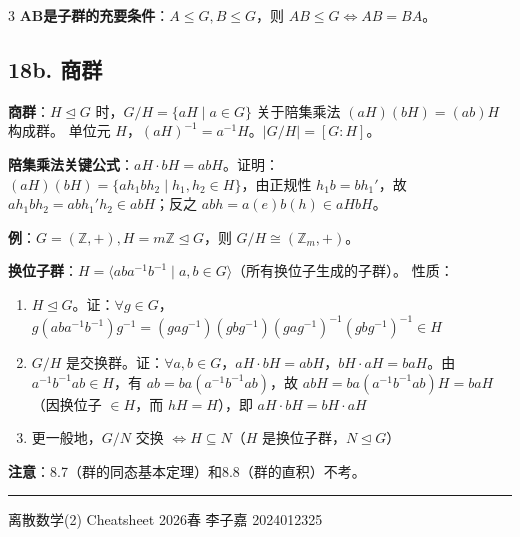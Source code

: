 \documentclass[10pt,a4paper,landscape]{ctexart}
\begin{document}
\begin{multicols}{3}
\textbf{AB是子群的充要条件}：$A\leq G,B\leq G$，则 $AB\leq G\iff AB=BA$。

\subsection*{18b. 商群}

\textbf{商群}：$H\trianglelefteq G$ 时，$G/H=\{aH\mid a\in G\}$ 关于陪集乘法 $(aH)(bH)=(ab)H$ 构成群。
单位元 $H$，$(aH)^{-1}=a^{-1}H$。$|G/H|=[G:H]$。

\textbf{陪集乘法关键公式}：$\boxed{aH\cdot bH=abH}$。证明：$(aH)(bH)=\{ah_1bh_2\mid h_1,h_2\in H\}$，由正规性 $h_1b=bh_1'$，故 $ah_1bh_2=abh_1'h_2\in abH$；反之 $abh=a(e)b(h)\in aHbH$。

\textbf{例}：$G=(\mathbb{Z},+),H=m\mathbb{Z}\trianglelefteq G$，则 $G/H\cong(\mathbb{Z}_m,+)$。

\textbf{换位子群}：$H=\langle aba^{-1}b^{-1}\mid a,b\in G\rangle$（所有换位子生成的子群）。
性质：
\begin{enumerate}[nosep,leftmargin=*]
\item $H\trianglelefteq G$。证：$\forall g\in G$，$g(aba^{-1}b^{-1})g^{-1}=(gag^{-1})(gbg^{-1})(gag^{-1})^{-1}(gbg^{-1})^{-1}\in H$
\item $G/H$ 是交换群。证：$\forall a,b\in G$，$aH\cdot bH=abH$，$bH\cdot aH=baH$。由 $a^{-1}b^{-1}ab\in H$，有 $ab=ba(a^{-1}b^{-1}ab)$，故 $abH=ba(a^{-1}b^{-1}ab)H=baH$（因换位子 $\in H$，而 $hH=H$），即 $aH\cdot bH=bH\cdot aH$
\item 更一般地，$G/N$ 交换 $\iff H\subseteq N$（$H$ 是换位子群，$N\trianglelefteq G$）
\end{enumerate}

\textbf{注意}：8.7（群的同态基本定理）和8.8（群的直积）不考。

\vfill
\hrule
\begin{center}
\tiny 离散数学(2) Cheatsheet \quad 2026春 \quad 李子嘉 2024012325
\end{center}

\end{multicols}
\end{document}
